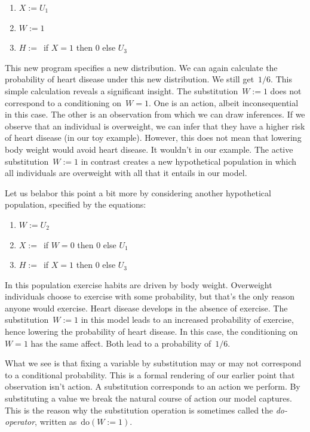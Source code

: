 \documentclass{tufte-book}
\begin{document}
\begin{enumerate}
\def\labelenumi{\arabic{enumi}.}
\setcounter{enumi}{1}
\tightlist
\item
  \(X := U_1\)
\item
  \(W := 1\)
\item
  \(H := \,\) if \(X=1\) then \(0\) else \(U_3\)
\end{enumerate}

This new program specifies a new distribution. We can again calculate
the probability of heart disease under this new distribution. We still
get~\(1/6.\) This simple calculation reveals a significant insight. The
substitution~\(W:=1\) does not correspond to a conditioning on~\(W=1.\)
One is an action, albeit inconsequential in this case. The other is an
observation from which we can draw inferences. If we observe that an
individual is overweight, we can infer that they have a higher risk of
heart disease (in our toy example). However, this does not mean that
lowering body weight would avoid heart disease. It wouldn't in our
example. The active substitution~\(W:=1\) in contrast creates a new
hypothetical population in which all individuals are overweight with all
that it entails in our model.

Let us belabor this point a bit more by considering another hypothetical
population, specified by the equations:

\begin{enumerate}
\def\labelenumi{\arabic{enumi}.}
\setcounter{enumi}{1}
\tightlist
\item
  \(W := U_2\)
\item
  \(X := \,\) if \(W=0\) then \(0\) else \(U_1\)
\item
  \(H := \,\) if \(X=1\) then \(0\) else \(U_3\)
\end{enumerate}

In this population exercise habits are driven by body weight. Overweight
individuals choose to exercise with some probability, but that's the
only reason anyone would exercise. Heart disease develops in the absence
of exercise. The substitution~\(W:=1\) in this model leads to an
increased probability of exercise, hence lowering the probability of
heart disease. In this case, the conditioning on~\(W=1\) has the same
affect. Both lead to a probability of~\(1/6.\)

What we see is that fixing a variable by substitution may or may not
correspond to a conditional probability. This is a formal rendering of
our earlier point that observation isn't action. A substitution
corresponds to an action we perform. By substituting a value we break
the natural course of action our model captures. This is the reason why
the substitution operation is sometimes called the \emph{do-operator},
written as~\(\mathrm{do}(W:=1)\).
\end{document}
